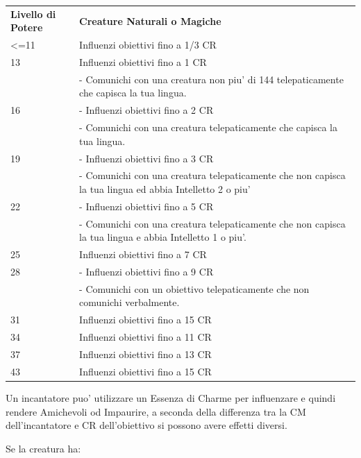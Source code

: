 \documentclass[a4paper,11pt,twoside,openany]{book}
\begin{document}
	\medskip
	
	\begin{tabular}{L{3cm} L{13cm}}
		\toprule
		\textbf{Livello di Potere} & \textbf{Creature Naturali o Magiche}\tabularnewline
		<=11 &Influenzi obiettivi fino a 1/3 CR\\
		13 & Influenzi obiettivi fino a 1 CR\\
		& - Comunichi con una creatura non piu' di 144 telepaticamente che capisca la tua lingua.\\
		16 & - Influenzi obiettivi fino a 2 CR\\
		& - Comunichi con una creatura telepaticamente che capisca la tua lingua.\\
		19 & - Influenzi obiettivi fino a 3 CR\\
		& - Comunichi con una creatura telepaticamente che non capisca la tua lingua ed abbia Intelletto 2 o piu'\\
		22 & - Influenzi obiettivi fino a 5 CR\\
		& - Comunichi con una creatura telepaticamente che non capisca la tua lingua e abbia Intelletto 1 o piu'.\\
		25 & Influenzi obiettivi fino a 7 CR \\
		28 & - Influenzi obiettivi fino a 9 CR\\
		& - Comunichi con un obiettivo telepaticamente che non comunichi verbalmente. \\
		31 & Influenzi obiettivi fino a 15 CR\\
		34 & Influenzi obiettivi fino a 11 CR\\
		37 & Influenzi obiettivi fino a 13 CR\\
		43 & Influenzi obiettivi fino a 15 CR\\
	\end{tabular}
	
	\medskip
	
	Un incantatore puo' utilizzare un Essenza di Charme per influenzare e quindi rendere Amichevoli od Impaurire, a seconda della differenza tra la CM dell'incantatore e CR dell'obiettivo si possono avere effetti diversi.
	
	\medskip
	
	Se la creatura ha:
	
\end{document}
